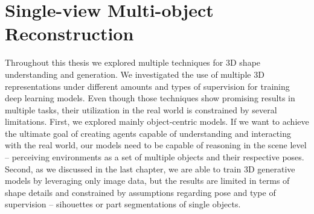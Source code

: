 \chapter{Single-view Multi-object Reconstruction}

Throughout this thesis we explored multiple techniques for 3D shape understanding
and generation.
We investigated the use of multiple 3D representations under different amounts and types of supervision for training deep learning models.
Even though those techniques show promising results in multiple tasks, their
utilization in the real world is constrained by several limitations.
First, we explored mainly object-centric models.
If we want to achieve the ultimate goal of creating agents capable of understanding
and interacting with the real world, our models need to be capable of
reasoning in the scene level -- perceiving environments as a set of multiple
objects and their respective poses.
Second, as we discussed in the last chapter, we are able to train 3D generative
models by leveraging only image data, 
but the results are limited in terms of shape details and
constrained by assumptions regarding pose and type of
supervision -- sihouettes or part segmentations of single objects.

